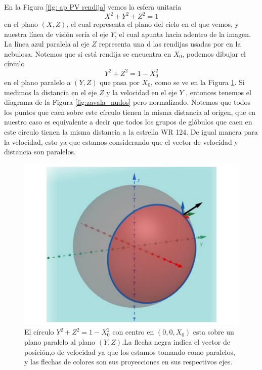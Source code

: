 \documentclass{book}
\begin{document}
En la Figura \ref{fig: ap PV rendija} vemos la esfera unitaria
\begin{equation}
X^2+Y^2+Z^2=1
\end{equation}
 en el plano $(X,Z)$, el cual representa el plano del cielo en el que vemos, y nuestra línea de visión sería el eje $Y$, el cual apunta hacia adentro de la imagen. La línea azul paralela al eje $Z$ representa una d las rendijas usadas por \cite{Zavala:2022} en  la nebulosa. Notemos que si está rendija se encuentra en $X_0$, podemos dibujar el círculo 
 \begin{equation}
 Y^2+Z^2=1-X_0^2
 \end{equation}
en el plano paralelo a $(Y,Z)$ que pasa por $X_0$, como se ve en la Figura \ref{fig:ap PV esfera3d}. Si medimos la distancia en el eje $Z$ y la velocidad en el eje $Y$ , entonces tenemos el diagrama de la Figura \ref{fig:zavala_nudos} pero normalizado. Notemos que todos los puntos que caen sobre este círculo tienen la misma distancia al origen, que en nuestro caso es equivalente a decir que todos los grupos de glóbulos que caen en este círculo tienen la misma distancia a la estrella WR 124. De igual manera para la velocidad, esto ya que estamos considerando que el vector de velocidad y distancia son paralelos.


\begin{figure}
    \centering
    \includegraphics[width=\textwidth]{imagenes_corregidas/n_esfe_02.pdf}
    \caption{El círculo $Y^2+Z^2=1-X_0^2$ con centro en $(0,0,X_0)$ esta sobre un plano paralelo al plano $(Y,Z)$.La flecha negra indica el vector de posición,o de velocidad ya que los estamos tomando como paralelos, y las flechas de colores son sus proyecciones en sus respectivos ejes.}
    \label{fig:ap PV esfera3d}
\end{figure}
\end{document}
